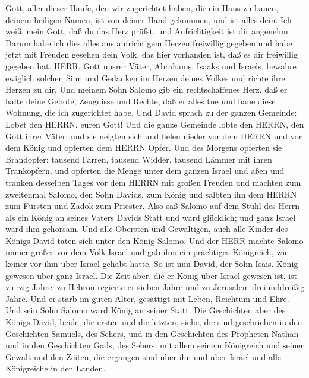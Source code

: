 Gott, aller dieser Haufe, den wir zugerichtet haben, dir ein Haus zu
bauen, deinem heiligen Namen, ist von deiner Hand gekommen, und ist
alles dein.  Ich weiß, mein Gott, daß du das Herz prüfst,
und Aufrichtigkeit ist dir angenehm. Darum habe ich dies alles aus
aufrichtigem Herzen freiwillig gegeben und habe jetzt mit Freuden
gesehen dein Volk, das hier vorhanden ist, daß es dir freiwillig gegeben
hat.  HERR, Gott unsrer Väter, Abrahams, Isaaks und
Israels, bewahre ewiglich solchen Sinn und Gedanken im Herzen deines
Volkes und richte ihre Herzen zu dir.  Und meinem Sohn
Salomo gib ein rechtschaffenes Herz, daß er halte deine Gebote,
Zeugnisse und Rechte, daß er alles tue und baue diese Wohnung, die ich
zugerichtet habe.  Und David sprach zu der ganzen Gemeinde:
Lobet den HERRN, euren Gott! Und die ganze Gemeinde lobte den HERRN, den
Gott ihrer Väter; und sie neigten sich und fielen nieder vor dem HERRN
und vor dem König  und opferten dem HERRN Opfer. Und des
Morgens opferten sie Brandopfer: tausend Farren, tausend Widder, tausend
Lämmer mit ihren Trankopfern, und opferten die Menge unter dem ganzen
Israel  und aßen und tranken desselben Tages vor dem HERRN
mit großen Freuden und machten zum zweitenmal Salomo, den Sohn Davids,
zum König und salbten ihn dem HERRN zum Fürsten und Zadok zum Priester.
 Also saß Salomo auf dem Stuhl des Herrn als ein König an
seines Vaters Davids Statt und ward glücklich; und ganz Israel ward ihm
gehorsam.  Und alle Obersten und Gewaltigen, auch alle
Kinder des Königs David taten sich unter den König Salomo. 
Und der HERR machte Salomo immer größer vor dem Volk Israel und gab ihm
ein prächtiges Königreich, wie keiner vor ihm über Israel gehabt hatte.
 So ist nun David, der Sohn Isais. König gewesen über ganz
Israel.  Die Zeit aber, die er König über Israel gewesen
ist, ist vierzig Jahre: zu Hebron regierte er sieben Jahre und zu
Jerusalem dreiunddreißig Jahre.  Und er starb im guten
Alter, gesättigt mit Leben, Reichtum und Ehre. Und sein Sohn Salomo ward
König an seiner Statt.  Die Geschichten aber des Königs
David, beide, die ersten und die letzten, siehe, die sind geschrieben in
den Geschichten Samuels, des Sehers, und in den Geschichten des
Propheten Nathan und in den Geschichten Gads, des Sehers, 
mit allem seinem Königreich und seiner Gewalt und den Zeiten, die
ergangen sind über ihn und über Israel und alle Königreiche in den
Landen.
